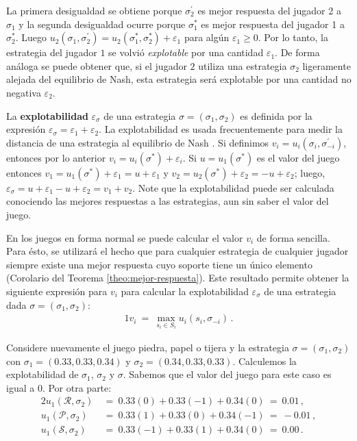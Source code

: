 La primera desigualdad se obtiene porque $\sigma^{\prime}_2$ es mejor respuesta del jugador 2 a $\sigma_1$ y la segunda desigualdad ocurre porque $\sigma^*_1$ es mejor respuesta del jugador 1 a $\sigma^*_2$. Luego $u_2(\sigma_1, \sigma^{\prime}_2) = u_2(\sigma^*_1, \sigma^*_2) + \varepsilon_1$ para algún $\varepsilon_1 \geq 0$. Por lo tanto, la estrategia del jugador $1$ se volvió \textit{explotable} por una cantidad $\varepsilon_1$. De forma análoga se puede obtener que, si el jugador $2$ utiliza una estrategia $\sigma_2$ ligeramente alejada del equilibrio de Nash, esta estrategia será explotable por una cantidad no negativa $\varepsilon_2$.

La \textbf{explotabilidad} $\varepsilon_\sigma$ de una estrategia $\sigma = (\sigma_1, \sigma_2)$ es definida por la expresión $\varepsilon_{\sigma} = \varepsilon_1 + \varepsilon_2$. La explotabilidad es usada frecuentemente para medir la distancia de una estrategia al equilibrio de Nash \cite[p. 7]{bib:thesis-marc-lanctot}. Si definimos $v_i = u_i(\sigma_i, \sigma^{\prime}_{-i})$, entonces por lo anterior $v_i = u_i(\sigma^*) + \varepsilon_i$. Si $u=u_1(\sigma^*)$ es el valor del juego entonces $v_1 = u_1(\sigma^*) + \varepsilon_1 = u + \varepsilon_1$ y $v_2 = u_2(\sigma^*) + \varepsilon_2 = -u + \varepsilon_2$; luego, $\varepsilon_{\sigma} = u + \varepsilon_1 - u + \varepsilon_2 =  v_1 + v_2$. Note que la explotabilidad puede ser calculada conociendo las mejores respuestas a las estrategias, aun sin saber el valor del juego.

En los juegos en forma normal se puede calcular el valor $v_i$ de forma sencilla. Para ésto, se utilizará el hecho que para cualquier estrategia de cualquier jugador siempre existe una mejor respuesta cuyo soporte tiene un único elemento (Corolario del Teorema \ref{theo:mejor-respuesta}). Este resultado permite obtener la siguiente expresión para $v_i$ para calcular la explotabilidad $\varepsilon_\sigma$ de una estrategia dada $\sigma=(\sigma_1,\sigma_2)$:
\begin{alignat}{1}
\label{eq:best-response-fn}
v_i\ =\ \max_{s_{i} \in S_{i}} u_i(s_i, \sigma_{-i}) \,.
\end{alignat}

Considere nuevamente el juego piedra, papel o tijera y la estrategia $\sigma = (\sigma_1, \sigma_2)$ con $\sigma_1 = (0.33, 0.33, 0.34)$ y $\sigma_2 = (0.34, 0.33, 0.33)$. Calculemos la explotabilidad de $\sigma_1$, $\sigma_2$ y $\sigma$. Sabemos que el valor del juego para este caso es igual a $0$. Por otra parte:
\begin{alignat}{2}
u_1(\mathcal{R}, \sigma_2)\ &=\  0.33(0) + 0.33(-1) +  0.34(0)\ =\  0.01 \,, \\
u_1(\mathcal{P}, \sigma_2)\ &=\  0.33(1) +  0.33(0) + 0.34(-1)\ =\ -0.01 \,, \\
u_1(\mathcal{S}, \sigma_2)\ &=\ 0.33(-1) +  0.33(1) +  0.34(0)\ =\  0.00 \,.
\end{alignat}

